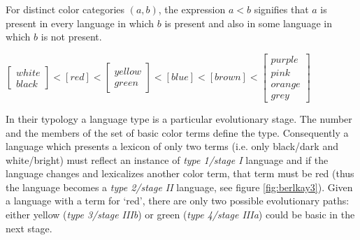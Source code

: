 \begin{exe}
  \ex\label{ex:schemata}
For distinct color categories $(a,b)$, the expression $a< b$ signifies that $a$
is present in every language in which $b$ is present and also in some language
in which $b$ is not present.


  \centering
$ \left[
  \begin{array}{ l  }
   white  \\
   black
  \end{array} \right]
  < [red] < \left[
  \begin{array}{ l  }
  yellow  \\
   green
  \end{array} \right] < [blue] < [brown] < \left[
  \begin{array}{l }
  purple\\
 pink\\
 orange\\
 grey
  \end{array} \right]
$



\end{exe}


In their typology a language type is a
particular evolutionary  stage. The number and the members of the set of basic
color terms
define the type.   Consequently a language which presents a lexicon of only two
terms (i.e. only
black/dark and white/bright) must reflect an instance of  {\it type 1/stage I}
language 
and if the language changes and lexicalizes another color term, that term must
be red (thus the language becomes a \textit{type 2/stage II} language, see figure
\ref{fig:berlkay3}).  Given  a language with a term for `red', there are only
two possible evolutionary paths: either yellow (\textit{type 3/stage IIIb})  or
green (\textit{type 4/stage IIIa}) could be  basic in the next stage. 

